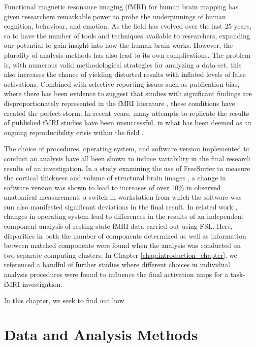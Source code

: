 Functional magnetic resonance imaging (fMRI) for human brain mapping has given researchers remarkable power to probe the underpinnings of human cognition, behaviour, and emotion. As the field has evolved over the last 25 years, so to have the number of tools and techniques available to researchers, expanding our potential to gain insight into how the human brain works. However, the plurality of analysis methods has also lead to its own complications. The problem is, with numerous valid methodological strategies for analyzing a data set, this also increases the chance of yielding distorted results with inflated levels of false activations. Combined with selective reporting issues such as publication bias, where there has been evidence to suggest that studies with significant findings are disproportionately represented in the fMRI literature \citep{David2013-iz,Ioannidis2014-yn}, these conditions have created the perfect storm. In recent years, many attempts to replicate the results of published fMRI studies have been unsuccessful, in what has been deemed as an ongoing reproducibility crisis within the field \citep{Poldrack2017-rr,Gorgolewski2016-fk,Open_Science_Collaboration2015-gr}.

The choice of procedures, operating system, and software version implemented to conduct an analysis have all been shown to induce variability in the final research results of an investigation. In a study examining the use of FreeSurfer to measure the cortical thickness and volume of structural brain images \citep{Gronenschild2012-gf}, a change in software version was shown to lead to increases of over 10\% in observed anatomical measurement; a switch in workstation from which the software was run also manifested significant deviations in the final result. In related work \citep{Glatard2015-ml}, changes in operating system lead to differences in the results of an independent component analysis of resting state fMRI data carried out using FSL. Here, disparities in both the number of components determined as well as information between matched components were found when the analysis was conducted on two separate computing clusters. In Chapter \ref{chap:introduction_chapter}, we referenced a handful of further studies where different choices in individual analysis procedures were found to influence the final activation maps for a task-fMRI investigation.

In this chapter, we seek to find out how 


\section{Data and Analysis Methods}

